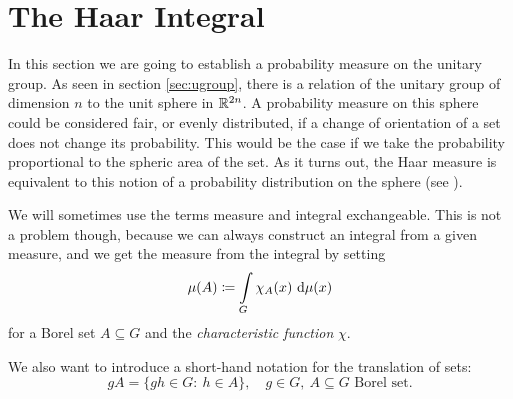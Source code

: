 \documentclass[a4paper,11pt, BCOR=4mm, DIV=12, pagesize]{scrartcl}
\begin{document}
\section{The Haar Integral}

In this section we are going to establish a probability measure on the unitary 
group. As seen in section \ref{sec:ugroup}, there is a relation of the unitary 
group of dimension $n$ to the unit sphere in $\mathbb{R}^{2n}$. A probability measure 
on this sphere could be considered fair, or evenly distributed, if a change of  
orientation of a set does not change its probability. This would be 
the case if we take the probability proportional to the spheric area of the 
set. As it turns out, the Haar measure is equivalent to this notion of a 
probability distribution on the sphere (see \cite{christensen}).


% 
%   

\begin{notation}
 We will sometimes use the terms measure and integral exchangeable. This is not 
a problem though, because we can always construct an integral from a given 
measure, and we get the measure from the integral by setting
 \begin{equation}
  \mu(A) \coloneqq \int\limits_G \chi_A(x)\ \mathrm{d}\mu(x)
 \end{equation}
  for a Borel set $A\subseteq G$ and the \emph{characteristic function} $\chi$.
 
 We also want to introduce a short-hand notation for the translation of sets:
 \begin{equation}
  gA = \{gh\in G:\ h\in A\},\quad g\in G,\ A \subseteq G \text{ Borel set}.
 \end{equation}
\end{notation}
\end{document}
